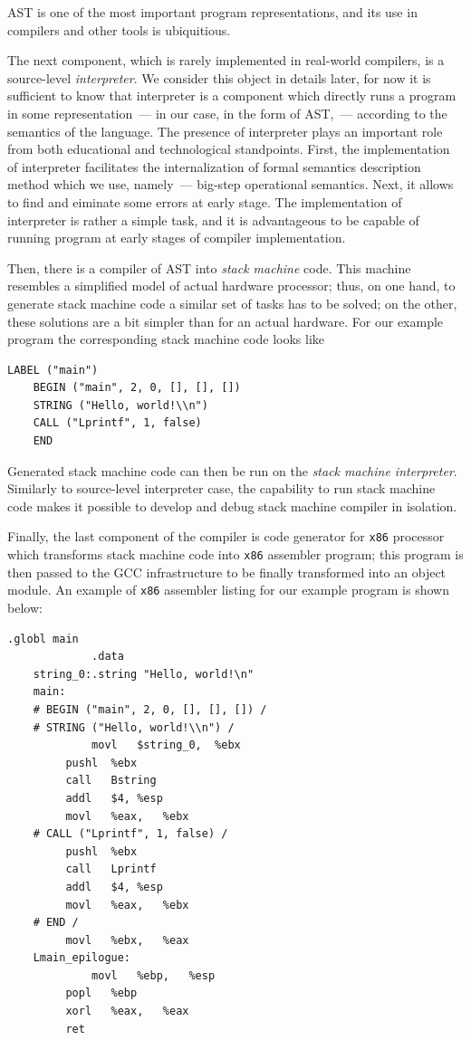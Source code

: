 \documentclass{book}
\begin{document}
AST is one of the most important program representations, and its use in compilers and other
tools is ubiquitious. 

The next component, which is rarely implemented in real-world compilers, is a source-level \emph{interpreter}. We
consider this object in details later, for now it is sufficient to know that interpreter is a component which
directly runs a program in some representation~--- in our case, in the form of AST,~--- according to the semantics of the language. 
The presence of interpreter plays an important role from both educational and technological standpoints. First,
the implementation of interpreter facilitates the internalization of formal semantics description method which
we use, namely~--- big-step operational semantics. Next, it allows to find and eiminate some errors 
at early stage. The implementation of interpreter is rather a simple task, and it is advantageous to be capable of running program
at early stages of compiler implementation.

Then, there is a compiler of AST into \emph{stack machine} code. This machine resembles a simplified model of
actual hardware processor; thus, on one hand, to generate stack machine code a similar set of tasks has to be
solved; on the other, these solutions are a bit simpler than for an actual hardware. For our example
program the corresponding stack machine code looks like

\begin{lstlisting}[language=plain,basicstyle=\small]
    LABEL ("main")
    BEGIN ("main", 2, 0, [], [], [])
    STRING ("Hello, world!\\n")
    CALL ("Lprintf", 1, false)
    END      
\end{lstlisting}

Generated stack machine code can then be run on the \emph{stack machine interpreter}. Similarly to source-level
interpreter case, the capability to run stack machine code makes it possible to develop and debug stack
machine compiler in isolation.

Finally, the last component of the compiler is code generator for \texttt{x86} processor which
transforms stack machine code into \texttt{x86} assembler program; this program is then passed to
the \textsc{GCC} infrastructure to be finally transformed into an object module. An example of
\texttt{x86} assembler listing for our example program is shown below:

\begin{lstlisting}[language=plain,basicstyle=\small]
             .globl	main
             .data
    string_0:.string "Hello, world!\n"
    main:
    # BEGIN ("main", 2, 0, [], [], []) / 
    # STRING ("Hello, world!\\n") / 
             movl	$string_0,	%ebx
	     pushl	%ebx
	     call	Bstring
	     addl	$4,	%esp
	     movl	%eax,	%ebx
    # CALL ("Lprintf", 1, false) / 
	     pushl	%ebx
	     call	Lprintf
	     addl	$4,	%esp
	     movl	%eax,	%ebx
    # END / 
	     movl	%ebx,	%eax
    Lmain_epilogue:
             movl	%ebp,	%esp
	     popl	%ebp
	     xorl	%eax,	%eax
	     ret
\end{lstlisting}
\end{document}
